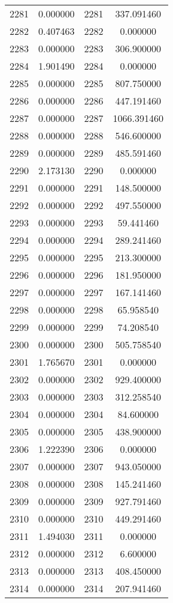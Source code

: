 \documentclass[12pt]{article}
\begin{document}
\begin{longtable}{@{}cccc@{}}
2281 & 0.000000 & 2281 & 337.091460 \\
2282 & 0.407463 & 2282 & 0.000000 \\
2283 & 0.000000 & 2283 & 306.900000 \\
2284 & 1.901490 & 2284 & 0.000000 \\
2285 & 0.000000 & 2285 & 807.750000 \\
2286 & 0.000000 & 2286 & 447.191460 \\
2287 & 0.000000 & 2287 & 1066.391460 \\
2288 & 0.000000 & 2288 & 546.600000 \\
2289 & 0.000000 & 2289 & 485.591460 \\
2290 & 2.173130 & 2290 & 0.000000 \\
2291 & 0.000000 & 2291 & 148.500000 \\
2292 & 0.000000 & 2292 & 497.550000 \\
2293 & 0.000000 & 2293 & 59.441460 \\
2294 & 0.000000 & 2294 & 289.241460 \\
2295 & 0.000000 & 2295 & 213.300000 \\
2296 & 0.000000 & 2296 & 181.950000 \\
2297 & 0.000000 & 2297 & 167.141460 \\
2298 & 0.000000 & 2298 & 65.958540 \\
2299 & 0.000000 & 2299 & 74.208540 \\
2300 & 0.000000 & 2300 & 505.758540 \\
2301 & 1.765670 & 2301 & 0.000000 \\
2302 & 0.000000 & 2302 & 929.400000 \\
2303 & 0.000000 & 2303 & 312.258540 \\
2304 & 0.000000 & 2304 & 84.600000 \\
2305 & 0.000000 & 2305 & 438.900000 \\
2306 & 1.222390 & 2306 & 0.000000 \\
2307 & 0.000000 & 2307 & 943.050000 \\
2308 & 0.000000 & 2308 & 145.241460 \\
2309 & 0.000000 & 2309 & 927.791460 \\
2310 & 0.000000 & 2310 & 449.291460 \\
2311 & 1.494030 & 2311 & 0.000000 \\
2312 & 0.000000 & 2312 & 6.600000 \\
2313 & 0.000000 & 2313 & 408.450000 \\
2314 & 0.000000 & 2314 & 207.941460 \\

\end{longtable}
\end{document}
